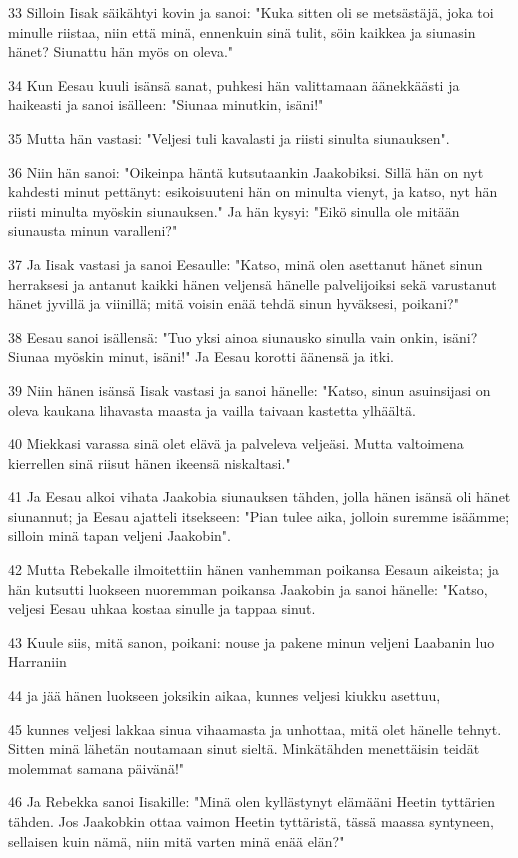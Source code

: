 \par 33 Silloin Iisak säikähtyi kovin ja sanoi: "Kuka sitten oli se metsästäjä, joka toi minulle riistaa, niin että minä, ennenkuin sinä tulit, söin kaikkea ja siunasin hänet? Siunattu hän myös on oleva."
\par 34 Kun Eesau kuuli isänsä sanat, puhkesi hän valittamaan äänekkäästi ja haikeasti ja sanoi isälleen: "Siunaa minutkin, isäni!"
\par 35 Mutta hän vastasi: "Veljesi tuli kavalasti ja riisti sinulta siunauksen".
\par 36 Niin hän sanoi: "Oikeinpa häntä kutsutaankin Jaakobiksi. Sillä hän on nyt kahdesti minut pettänyt: esikoisuuteni hän on minulta vienyt, ja katso, nyt hän riisti minulta myöskin siunauksen." Ja hän kysyi: "Eikö sinulla ole mitään siunausta minun varalleni?"
\par 37 Ja Iisak vastasi ja sanoi Eesaulle: "Katso, minä olen asettanut hänet sinun herraksesi ja antanut kaikki hänen veljensä hänelle palvelijoiksi sekä varustanut hänet jyvillä ja viinillä; mitä voisin enää tehdä sinun hyväksesi, poikani?"
\par 38 Eesau sanoi isällensä: "Tuo yksi ainoa siunausko sinulla vain onkin, isäni? Siunaa myöskin minut, isäni!" Ja Eesau korotti äänensä ja itki.
\par 39 Niin hänen isänsä Iisak vastasi ja sanoi hänelle: "Katso, sinun asuinsijasi on oleva kaukana lihavasta maasta ja vailla taivaan kastetta ylhäältä.
\par 40 Miekkasi varassa sinä olet elävä ja palveleva veljeäsi. Mutta valtoimena kierrellen sinä riisut hänen ikeensä niskaltasi."
\par 41 Ja Eesau alkoi vihata Jaakobia siunauksen tähden, jolla hänen isänsä oli hänet siunannut; ja Eesau ajatteli itsekseen: "Pian tulee aika, jolloin suremme isäämme; silloin minä tapan veljeni Jaakobin".
\par 42 Mutta Rebekalle ilmoitettiin hänen vanhemman poikansa Eesaun aikeista; ja hän kutsutti luokseen nuoremman poikansa Jaakobin ja sanoi hänelle: "Katso, veljesi Eesau uhkaa kostaa sinulle ja tappaa sinut.
\par 43 Kuule siis, mitä sanon, poikani: nouse ja pakene minun veljeni Laabanin luo Harraniin
\par 44 ja jää hänen luokseen joksikin aikaa, kunnes veljesi kiukku asettuu,
\par 45 kunnes veljesi lakkaa sinua vihaamasta ja unhottaa, mitä olet hänelle tehnyt. Sitten minä lähetän noutamaan sinut sieltä. Minkätähden menettäisin teidät molemmat samana päivänä!"
\par 46 Ja Rebekka sanoi Iisakille: "Minä olen kyllästynyt elämääni Heetin tyttärien tähden. Jos Jaakobkin ottaa vaimon Heetin tyttäristä, tässä maassa syntyneen, sellaisen kuin nämä, niin mitä varten minä enää elän?"

